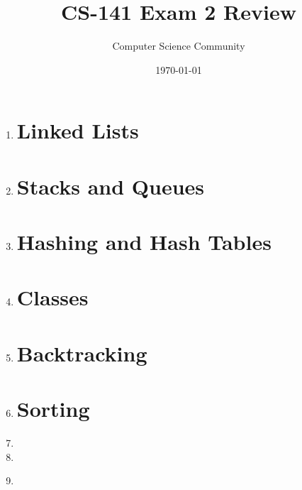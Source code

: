 \documentclass[11pt]{article}
\title{CS-141 Exam 2 Review}
\author{Computer Science Community}
\date{\today}
\begin{document}
\header

\begin{enumerate}

\section*{Recursion}
	\item 

\pagebreak
\section*{Linked Lists}
    \item 

\pagebreak
\section*{Stacks and Queues}
	\item 

\pagebreak
\section*{Hashing and Hash Tables}
	\item 

\section*{Classes}
	\item 
	
\section*{Backtracking}
	\item 

\newpage
\section*{Sorting}
	\item 

	\item 

	\item \label{qsort-worst-case} 


\end{enumerate}
\end{document}
